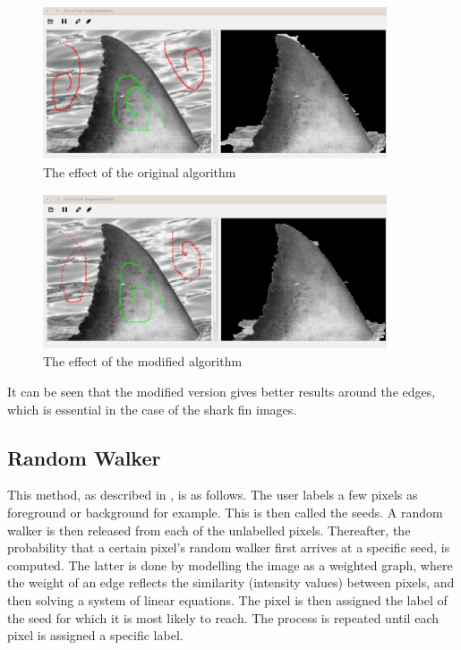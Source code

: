 \documentclass[a4paper,10pt]{article}
\begin{document}
\begin{figure}[H]
 \centering
 \includegraphics[width=4in, height=1.8in]{haaio}
 \caption{The effect of the original algorithm}
 \label{fin1}
\end{figure}

\begin{figure}[H]
 \centering
 \includegraphics[width=4in, height=1.8in]{haaim}
 \caption{The effect of the modified algorithm}
 \label{fin2}
\end{figure}

\noindent It can be seen that the modified version gives better results around
the edges, which is essential in the case of the shark fin images. \\  


\subsection{Random Walker}
This method, as
described in \cite{rw}, is as follows.  The user labels a few
pixels as foreground or background for example.  This is then called the seeds. 
A random walker is then released from each of the unlabelled pixels. 
Thereafter, the probability that a certain pixel's random walker first arrives
at a specific seed, is computed.  The latter is done by modelling the image as a weighted graph, where
the weight of an edge reflects the similarity (intensity values) between pixels,
and then solving a system of linear equations.  The pixel is then assigned the
label
of the seed for which it is most likely to reach.  The process is repeated until
each pixel is assigned a specific label.
\end{document}
